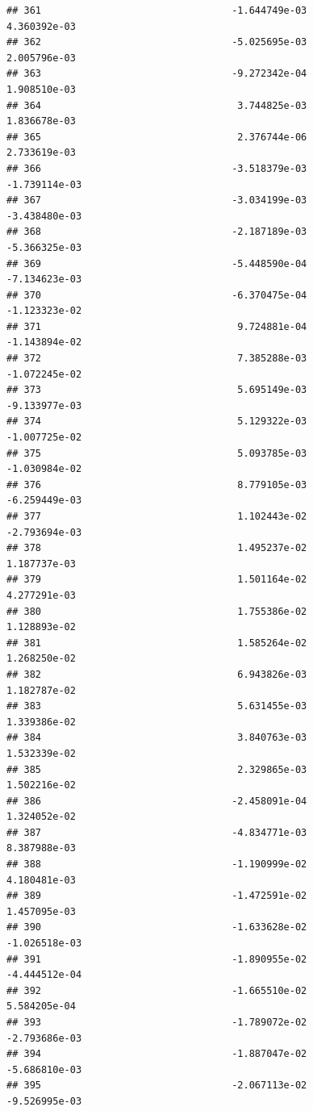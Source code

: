 \documentclass[
]{article}
\begin{document}
\begin{verbatim}
## 361                                 -1.644749e-03           4.360392e-03
## 362                                 -5.025695e-03           2.005796e-03
## 363                                 -9.272342e-04           1.908510e-03
## 364                                  3.744825e-03           1.836678e-03
## 365                                  2.376744e-06           2.733619e-03
## 366                                 -3.518379e-03          -1.739114e-03
## 367                                 -3.034199e-03          -3.438480e-03
## 368                                 -2.187189e-03          -5.366325e-03
## 369                                 -5.448590e-04          -7.134623e-03
## 370                                 -6.370475e-04          -1.123323e-02
## 371                                  9.724881e-04          -1.143894e-02
## 372                                  7.385288e-03          -1.072245e-02
## 373                                  5.695149e-03          -9.133977e-03
## 374                                  5.129322e-03          -1.007725e-02
## 375                                  5.093785e-03          -1.030984e-02
## 376                                  8.779105e-03          -6.259449e-03
## 377                                  1.102443e-02          -2.793694e-03
## 378                                  1.495237e-02           1.187737e-03
## 379                                  1.501164e-02           4.277291e-03
## 380                                  1.755386e-02           1.128893e-02
## 381                                  1.585264e-02           1.268250e-02
## 382                                  6.943826e-03           1.182787e-02
## 383                                  5.631455e-03           1.339386e-02
## 384                                  3.840763e-03           1.532339e-02
## 385                                  2.329865e-03           1.502216e-02
## 386                                 -2.458091e-04           1.324052e-02
## 387                                 -4.834771e-03           8.387988e-03
## 388                                 -1.190999e-02           4.180481e-03
## 389                                 -1.472591e-02           1.457095e-03
## 390                                 -1.633628e-02          -1.026518e-03
## 391                                 -1.890955e-02          -4.444512e-04
## 392                                 -1.665510e-02           5.584205e-04
## 393                                 -1.789072e-02          -2.793686e-03
## 394                                 -1.887047e-02          -5.686810e-03
## 395                                 -2.067113e-02          -9.526995e-03

\end{verbatim}
\end{document}
